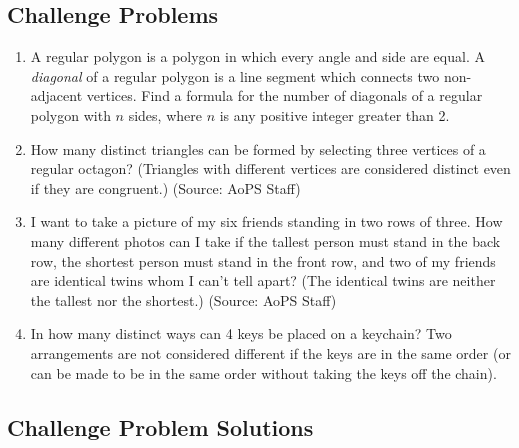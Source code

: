 \documentclass[12pt, letterpaper]{article}
\begin{document}
\subsection{Challenge Problems}

\begin{enumerate}
    \item A regular polygon is a polygon in which every angle and side are equal. A \textit{diagonal} of a regular polygon is a line segment which connects two non-adjacent vertices. Find a formula for the number of diagonals of a regular polygon with $n$ sides, where $n$ is any positive integer greater than 2.
    \item How many distinct triangles can be formed by selecting three vertices of a regular octagon? (Triangles with different vertices are considered distinct even if they are congruent.) (Source: AoPS Staff)
    \item I want to take a picture of my six friends standing in two rows of three. How many different photos can I take if the tallest person must stand in the back row, the shortest person must stand in the front row, and two of my friends are identical twins whom I can't tell apart? (The identical twins are neither the tallest nor the shortest.) (Source: AoPS Staff)
    \item In how many distinct ways can 4 keys be placed on a keychain? Two arrangements are not considered different if the keys are in the same order (or can be made to be in the same order without taking the keys off the chain).
\end{enumerate}

\newpage
\subsection{Challenge Problem Solutions}
\end{document}
